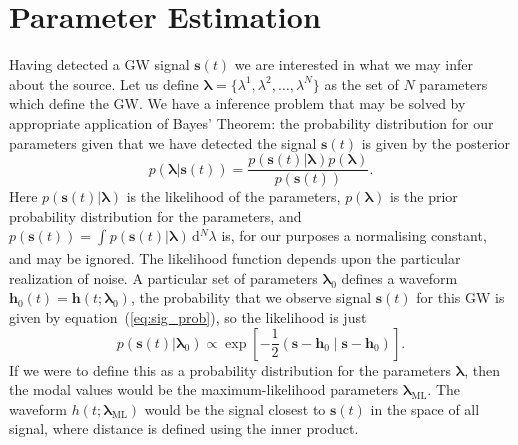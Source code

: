 \documentclass[a4paper, 11pt, titlepage, twoside]{report}
\newcommand{\eqnref}[1]{equation~(\ref{eq:#1})}
\newcommand{\sub}[1]{\ensuremath{_\mathrm{#1}}}
\newcommand{\recip}[1]{\ensuremath{\frac{1}{#1}}}
\newcommand{\innerprod}[2]{\ensuremath{\left({#1}\middle|{#2}\right)}}
\newcommand{\dd}{\ensuremath{\mathrm{d}}}
\newcommand{\intd}[4]{\ensuremath{\int_{#1}^{#2}{#3}\,\dd{#4}}}
\begin{document}
{\section{Parameter Estimation}

Having detected a GW signal $\boldsymbol{s}(t)$ we are interested in what we may infer about the source. Let us define $\boldsymbol{\lambda} = \{\lambda^1, \lambda^2, \ldots, \lambda^N\}$ as the set of $N$ parameters which define the GW. We have a inference problem that may be solved by appropriate application of Bayes' Theorem\cite{Jaynes2003}: the probability distribution for our parameters given that we have detected the signal $\boldsymbol{s}(t)$ is given by the posterior
\begin{equation}
p(\boldsymbol{\lambda}|\boldsymbol{s}(t)) = \frac{p(\boldsymbol{s}(t)|\boldsymbol{\lambda})p(\boldsymbol{\lambda})}{p(\boldsymbol{s}(t))}.
\end{equation}
Here $p(\boldsymbol{s}(t)|\boldsymbol{\lambda})$ is the likelihood of the parameters, $p(\boldsymbol{\lambda})$ is the prior probability distribution for the parameters, and $p(\boldsymbol{s}(t)) = \intd{}{}{p(\boldsymbol{s}(t)|\boldsymbol{\lambda})}{^N \lambda}$ is, for our purposes a normalising constant, and may be ignored. The likelihood function depends upon the particular realization of noise. A particular set of parameters $\boldsymbol{\lambda}_0$ defines a waveform $\boldsymbol{h}_0(t) = \boldsymbol{h}(t; \boldsymbol{\lambda}_0)$, the probability that we observe signal $\boldsymbol{s}(t)$ for this GW is given by \eqnref{sig_prob}, so the likelihood is just
\begin{equation}
p(\boldsymbol{s}(t)|\boldsymbol{\lambda}_0) \propto \exp\left[-\recip{2}\innerprod{\boldsymbol{s}-\boldsymbol{h}_0}{\boldsymbol{s}-\boldsymbol{h}_0}\right].
\end{equation}
If we were to define this as a probability distribution for the parameters $\boldsymbol{\lambda}$, then the modal values would be the maximum-likelihood parameters $\boldsymbol{\lambda}\sub{ML}$. The waveform $h(t; \boldsymbol{\lambda}\sub{ML})$ would be the signal closest to $\boldsymbol{s}(t)$ in the space of all signal, where distance is defined using the inner product\cite{Cutler1994}.

}
\end{document}
